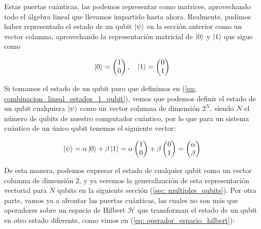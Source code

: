 \documentclass[12pt]{article}
\numberwithin{equation}{section} %
\begin{document}
    \vspace{5mm}

    Estas puertas cuánticas, las podemos representar como matrices, aprovechando todo el álgebra lineal que llevamos impartido hasta ahora. Realmente, pudimos haber representado el estado de un qubit \( \ket{\psi} \) en la sección anterior como un vector columna, aprovechando la representación matricial de \( \ket{0} \) y \( \ket{1} \) que sigue como

    \begin{equation}
        \ket{0} = \begin{pmatrix}
            1 \\
            0
        \end{pmatrix}
        , \quad \ket{1} = \begin{pmatrix}
            0 \\
            1
        \end{pmatrix}
    \end{equation}

    \vspace{2.5mm}

    Si tomamos el estado de un qubit puro que definimos en (\ref{eq: combinacion_lineal_estados_1_qubit}), vemos que podemos definir el estado de un qubit cualquiera \( \ket{\psi} \) como un vector columna de dimensión \( 2^{N} \), siendo \( N \) el número de qubits de nuestro computador cuántico, por lo que para un sistema cuántico de un único qubit tenemos el siguiente vector:

    \begin{equation}
        \ket{\psi} = \alpha \ket{0} + \beta \ket{1} = \alpha \begin{pmatrix}
        1 \\
        0
        \end{pmatrix} + \beta \begin{pmatrix}
        0 \\
        1
        \end{pmatrix} = \begin{pmatrix}
        \alpha \\
        \beta
        \end{pmatrix}
        \label{eq: vector_sistema_un_qubit}
    \end{equation}

    \vspace{2.5mm}

    De esta manera, podemos expresar el estado de cualquier qubit como un vector columna de dimensión 2, y ya veremos la generalización de esta representación vectorial para \( N \) qubits en la siguiente sección (\ref{sec: multiples_qubits}). Por otra parte, vamos ya a afrontar las puertas cuánticas, las cuales no son más que operadores sobre un espacio de Hilbert \( \mathcal{H} \) que transforman el estado de un qubit en otro estado diferente, como vimos en (\ref{eq: operador_espacio_hilbert}):
\end{document}
